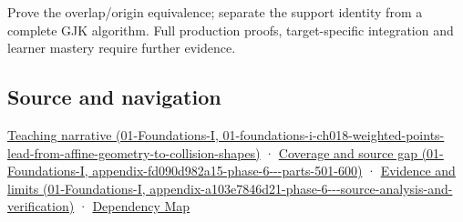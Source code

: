Prove the overlap/origin equivalence; separate the support identity from a complete GJK algorithm. Full production proofs, target-specific integration and learner mastery require further evidence.

\subsection{Source and navigation}\label{appendix-215ac7099a82-source-and-navigation}

\href{../01-Foundations-I/main.pdf\#nameddest=01-foundations-i-ch018-weighted-points-lead-from-affine-geometry-to-collision-shapes}{Teaching narrative (01-Foundations-I, 01-foundations-i-ch018-weighted-points-lead-from-affine-geometry-to-collision-shapes)} · \href{../01-Foundations-I/main.pdf\#nameddest=appendix-fd090d982a15-phase-6---parts-501-600}{Coverage and source gap (01-Foundations-I, appendix-fd090d982a15-phase-6-\/-\/-parts-501-600)} · \href{../01-Foundations-I/main.pdf\#nameddest=appendix-a103e7846d21-phase-6---source-analysis-and-verification}{Evidence and limits (01-Foundations-I, appendix-a103e7846d21-phase-6-\/-\/-source-analysis-and-verification)} · \hyperref[appendix-4ad47bdd269a]{Dependency Map}
